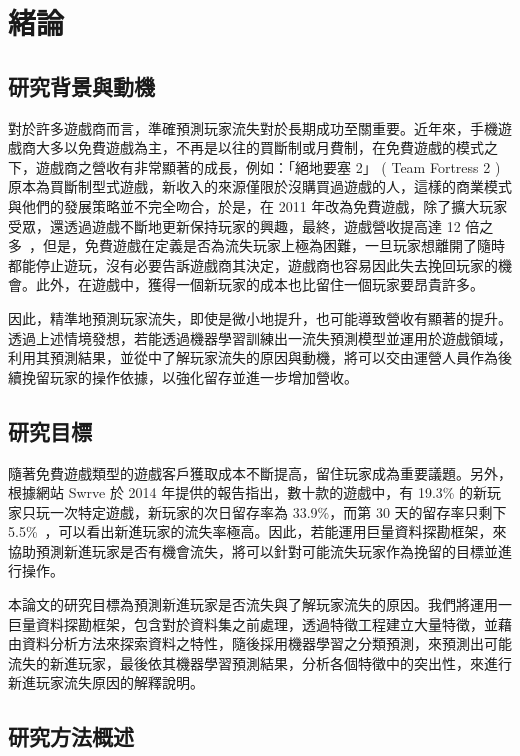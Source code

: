 \chapter{緒論}

\section{研究背景與動機}

對於許多遊戲商而言，準確預測玩家流失對於長期成功至關重要。近年來，手機遊戲商大多以免費遊戲為主，不再是以往的買斷制或月費制，在免費遊戲的模式之下，遊戲商之營收有非常顯著的成長，例如：「絕地要塞 2」 ( Team Fortress 2 ) 原本為買斷制型式遊戲，新收入的來源僅限於沒購買過遊戲的人，這樣的商業模式與他們的發展策略並不完全吻合，於是，在 2011 年改為免費遊戲，除了擴大玩家受眾，還透過遊戲不斷地更新保持玩家的興趣，最終，遊戲營收提高達 12 倍之多~\cite{miller2012gdc}，但是，免費遊戲在定義是否為流失玩家上極為困難，一旦玩家想離開了隨時都能停止遊玩，沒有必要告訴遊戲商其決定，遊戲商也容易因此失去挽回玩家的機會。此外，在遊戲中，獲得一個新玩家的成本也比留住一個玩家要昂貴許多。

因此，精準地預測玩家流失，即使是微小地提升，也可能導致營收有顯著的提升。透過上述情境發想，若能透過機器學習訓練出一流失預測模型並運用於遊戲領域，利用其預測結果，並從中了解玩家流失的原因與動機，將可以交由運營人員作為後續挽留玩家的操作依據，以強化留存並進一步增加營收。

\section{研究目標}

隨著免費遊戲類型的遊戲客戶獲取成本不斷提高，留住玩家成為重要議題。另外，根據網站 Swrve 於 2014 年提供的報告指出，數十款的遊戲中，有 19.3\% 的新玩家只玩一次特定遊戲，新玩家的次日留存率為 33.9\%，而第 30 天的留存率只剩下 5.5\%~\cite{SwrveNewPlayerReport}，可以看出新進玩家的流失率極高。因此，若能運用巨量資料探勘框架，來協助預測新進玩家是否有機會流失，將可以針對可能流失玩家作為挽留的目標並進行操作。

本論文的研究目標為預測新進玩家是否流失與了解玩家流失的原因。我們將運用一巨量資料探勘框架，包含對於資料集之前處理，透過特徵工程建立大量特徵，並藉由資料分析方法來探索資料之特性，隨後採用機器學習之分類預測，來預測出可能流失的新進玩家，最後依其機器學習預測結果，分析各個特徵中的突出性，來進行新進玩家流失原因的解釋說明。

\section{研究方法概述}

